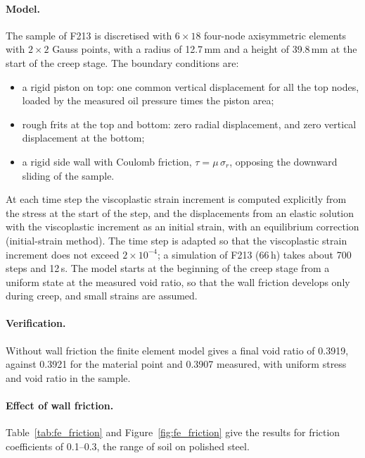 \paragraph{Model.} The sample of F213 is discretised with $6\times18$ four-node axisymmetric elements with $2\times2$ Gauss points, with a radius of 12.7\,mm and a height of 39.8\,mm at the start of the creep stage. The boundary conditions are:
\begin{itemize}
    \item a rigid piston on top: one common vertical displacement for all the top nodes, loaded by the measured oil pressure times the piston area;
    \item rough frits at the top and bottom: zero radial displacement, and zero vertical displacement at the bottom;
    \item a rigid side wall with Coulomb friction, $\tau = \mu\,\sigma_r$, opposing the downward sliding of the sample.
\end{itemize}
At each time step the viscoplastic strain increment is computed explicitly from the stress at the start of the step, and the displacements from an elastic solution with the viscoplastic increment as an initial strain, with an equilibrium correction (initial-strain method). The time step is adapted so that the viscoplastic strain increment does not exceed $2\times10^{-4}$; a simulation of F213 (66\,h) takes about 700 steps and 12\,s. The model starts at the beginning of the creep stage from a uniform state at the measured void ratio, so that the wall friction develops only during creep, and small strains are assumed.

\paragraph{Verification.} Without wall friction the finite element model gives a final void ratio of 0.3919, against 0.3921 for the material point and 0.3907 measured, with uniform stress and void ratio in the sample.

\paragraph{Effect of wall friction.} Table~\ref{tab:fe_friction} and Figure~\ref{fig:fe_friction} give the results for friction coefficients of 0.1--0.3, the range of soil on polished steel.

